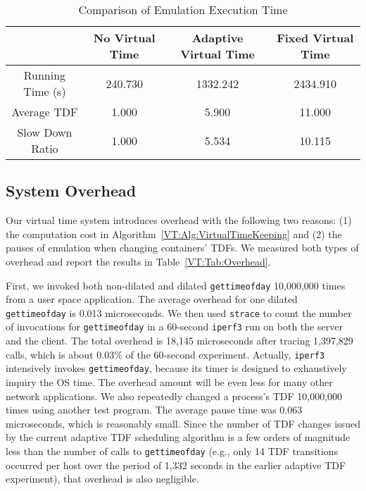 \begin{table*}
\centering
\caption{Comparison of Emulation Execution Time}
\begin{tabular}{c|c|c|c} 
\hline
 & No Virtual Time & Adaptive Virtual Time & Fixed Virtual Time \\ 
\hline
\hline
Running Time (s)  & 240.730 & 1332.242 & 2434.910 \\ 
\hline
Average TDF & 1.000 & 5.900 & 11.000 \\ 
\hline
Slow Down Ratio & 1.000 & 5.534 & 10.115 \\
\hline
\end{tabular}
\label{VT:Tab:CompareRunTime}
\end{table*}

\subsection{System Overhead}
Our virtual time system introduces overhead with the following two reasons:
(1) the computation cost in Algorithm~\ref{VT:Alg:VirtualTimeKeeping} and
(2) the pauses of emulation when changing containers' TDFs.
We measured both types of overhead and report the results in Table~\ref{VT:Tab:Overhead}.

First, we invoked both non-dilated and dilated \texttt{gettimeofday} 10,000,000 times from a user space application.
The average overhead for one dilated \texttt{gettimeofday} is 0.013 microseconds.
We then used \texttt{strace} to count the number of invocations for \texttt{gettimeofday} in a 60-second \texttt{iperf3} run on both the server and the client.
The total overhead is 18,145 microseconds after tracing 1,397,829 calls, which is about 0.03\% of the 60-second experiment. 
Actually, \texttt{iperf3} intensively invokes \texttt{gettimeofday},
because its timer is designed to exhaustively inquiry the OS time.
The overhead amount will be even less for many other network applications.
We also repeatedly changed a process's TDF 10,000,000 times using another test program.
The average pause time was 0.063 microseconds, which is reasonably small.
Since the number of TDF changes issued by the current adaptive TDF scheduling algorithm
is a few orders of magnitude less than the number of calls to \texttt{gettimeofday}
(e.g., only 14 TDF transitions occurred per host over the period of 1,332 seconds in the earlier adaptive TDF experiment), that overhead is also negligible.

